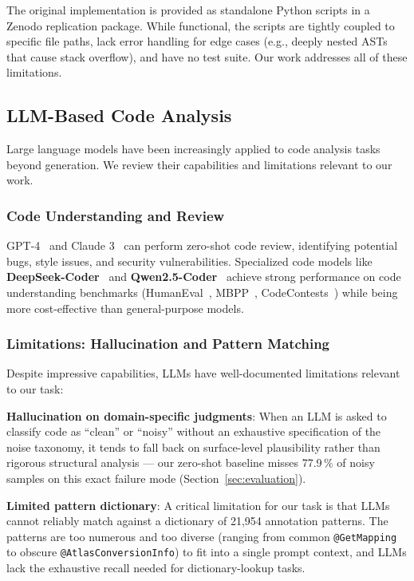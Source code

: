 \documentclass[acmlarge,nonacm,screen]{acmart}
\begin{document}
The original implementation is provided as standalone Python scripts in a Zenodo replication package. While functional, the scripts are tightly coupled to specific file paths, lack error handling for edge cases (e.g., deeply nested ASTs that cause stack overflow), and have no test suite. Our work addresses all of these limitations.

\subsection{LLM-Based Code Analysis}

Large language models have been increasingly applied to code analysis tasks beyond generation. We review their capabilities and limitations relevant to our work.

\subsubsection{Code Understanding and Review}

GPT-4~\cite{openai2023gpt4} and Claude 3~\cite{anthropic2024claude} can perform zero-shot code review, identifying potential bugs, style issues, and security vulnerabilities. Specialized code models like \textbf{DeepSeek-Coder}~\cite{guo2024deepseek} and \textbf{Qwen2.5-Coder}~\cite{hui2024qwen} achieve strong performance on code understanding benchmarks (HumanEval~\cite{chen2021humaneval}, MBPP~\cite{austin2021mbpp}, CodeContests~\cite{li2022alphacode}) while being more cost-effective than general-purpose models.

\subsubsection{Limitations: Hallucination and Pattern Matching}

Despite impressive capabilities, LLMs have well-documented limitations relevant to our task:

\textbf{Hallucination on domain-specific judgments}: When an LLM is asked to classify code as ``clean'' or ``noisy'' without an exhaustive specification of the noise taxonomy, it tends to fall back on surface-level plausibility rather than rigorous structural analysis --- our zero-shot baseline misses 77.9\,\% of noisy samples on this exact failure mode (Section~\ref{sec:evaluation}).

\textbf{Limited pattern dictionary}: A critical limitation for our task is that LLMs cannot reliably match against a dictionary of 21,954 annotation patterns. The patterns are too numerous and too diverse (ranging from common \texttt{@GetMapping} to obscure \texttt{@AtlasConversionInfo}) to fit into a single prompt context, and LLMs lack the exhaustive recall needed for dictionary-lookup tasks.
\end{document}
